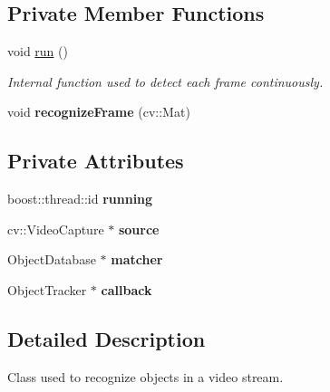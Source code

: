 \subsection*{Private Member Functions}
\begin{DoxyCompactItemize}
\item 
void \hyperlink{class_object_recognizer_a32fb13dc97145cae8abe1856f96c8ad1}{run} ()
\begin{DoxyCompactList}\small\item\em Internal function used to detect each frame continuously. \end{DoxyCompactList}\item 
\hypertarget{class_object_recognizer_ac0c047a6911963fc91c03e5111d8a0c3}{void {\bfseries recognize\-Frame} (cv\-::\-Mat)}\label{class_object_recognizer_ac0c047a6911963fc91c03e5111d8a0c3}

\end{DoxyCompactItemize}
\subsection*{Private Attributes}
\begin{DoxyCompactItemize}
\item 
\hypertarget{class_object_recognizer_aee26392dc99c66018fc8db97a5e0c992}{boost\-::thread\-::id {\bfseries running}}\label{class_object_recognizer_aee26392dc99c66018fc8db97a5e0c992}

\item 
\hypertarget{class_object_recognizer_ad6997fb90d83f596e4a5f57a31a46c22}{cv\-::\-Video\-Capture $\ast$ {\bfseries source}}\label{class_object_recognizer_ad6997fb90d83f596e4a5f57a31a46c22}

\item 
\hypertarget{class_object_recognizer_a9208e9eaf8bf15239699000d2031146b}{Object\-Database $\ast$ {\bfseries matcher}}\label{class_object_recognizer_a9208e9eaf8bf15239699000d2031146b}

\item 
\hypertarget{class_object_recognizer_a254da296e706b2f51a26b769ea12d368}{Object\-Tracker $\ast$ {\bfseries callback}}\label{class_object_recognizer_a254da296e706b2f51a26b769ea12d368}

\end{DoxyCompactItemize}


\subsection{Detailed Description}
Class used to recognize objects in a video stream. 

